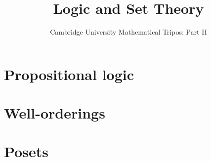 \documentclass{article}
\title{Logic and Set Theory}
\author{Cambridge University Mathematical Tripos: Part II}
\begin{document}
\maketitle

\tableofcontentsnewpage{}

\section{Propositional logic}

\section{Well-orderings}

\section{Posets}

\end{document}
